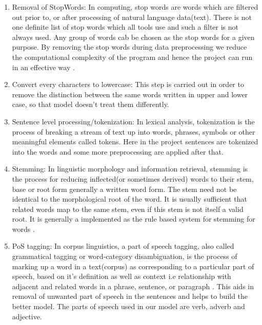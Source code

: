 \begin{enumerate}
\item Removal of StopWords:
In computing, stop words are words which are filtered out prior to, or after processing of natural language data(text). There is not one definite list of stop words which all tools use and such a filter is not always used. Any group of words cab be chosen as the stop words for a given purpose. By removing the stop words during data preprocessing we reduce the computational complexity of the program and hence the project can run in an effective way \cite{stopwords}.
\item Convert every characters to lowercase:
This step is carried out in order to remove the distinction between the same words written in upper and lower case, so that model doesn't treat them differently.
\item Sentence level processing/tokenization:
In lexical analysis, tokenization is the process of breaking a stream of text up into words, phrases, symbols or other meaningful elements called tokens. Here in the project sentences are tokenized into the words and some more preprocessing are applied after that.
\item Stemming:
In linguistic morphology and information retrieval, stemming is the process for reducing inflected(or sometimes derived) words to their stem, base or root form generally a written word form. The stem need not be identical to the morphological root of the word. It is usually sufficient that related words map to the same stem, even if this stem is not itself a valid root. It is generally a implemented as the rule based system for stemming for words \cite{porter}.
\item PoS tagging:
In corpus linguistics, a part of speech tagging, also called grammatical tagging or word-category disambiguation, is the process of marking up a word in a text(corpus) as corresponding to a particular part of speech, based on it's definition as well as context i.e relationship with adjacent and related words in a phrase, sentence, or paragraph \cite{pos}. This aids in removal of unwanted part of speech in the sentences and helps to build the better model. The parts of speech used in our model are verb, adverb and adjective.
\end{enumerate}

